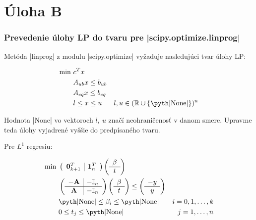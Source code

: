 \documentclass[report.tex]{subfiles}
\begin{document}
   

\section{Úloha B}


\subsubsection{Prevedenie úlohy LP do tvaru pre \pyth|scipy.optimize.linprog|}

Metóda \pyth|linprog| z modulu \pyth|scipy.optimize| vyžaduje nasledujúci tvar úlohy LP:

\begin{align*}
	\text{min}~ &c^Tx\\
	&A_{ub}x \leq b_{ub} \\
	&A_{eq}x \leq b_{eq} \\
	&l \leq x \leq u & l,u \in (\mathbb{R}\cup \{\text{\pyth|None|\}})^n 
\end{align*}

Hodnota \pyth|None| vo vektoroch $l,~u$ značí neohraničenosť v danom smere. Upravme teda úlohy vyjadrené vyššie do predpísaného tvaru.

Pre $L^1$ regresiu:

\begin{align*}
	\text{min}~ &
	\left(
	\begin{array}{c|c}
		\mathbf{0}_{k+1}^T & \mathbf{1}_n^T
	\end{array}
	\right)
	\left(
	\begin{array}{c}
		\beta \\
		\hline
		t
	\end{array}
	\right) \\
	&\left(
	\begin{array}{c|c}
		-\mathbf{A} & -\mathbb{I}_n \\
		\hline
		\mathbf{A} & -\mathbb{I}_n
	\end{array}
	\right)
	\left(
	\begin{array}{c}
		\beta \\
		\hline
		t
	\end{array}
	\right)
	\leq
	\left(
	\begin{array}{c}
		-y \\
		\hline
		y
	\end{array}
	\right) \\
	&\text{\pyth|None|} \leq \beta_i \leq \text{\pyth|None|} &i = 0,1,\dots,k\\
	&0 \leq t_j \leq \text{\pyth|None|} &j = 1,\dots,n
\end{align*}
\end{document}
